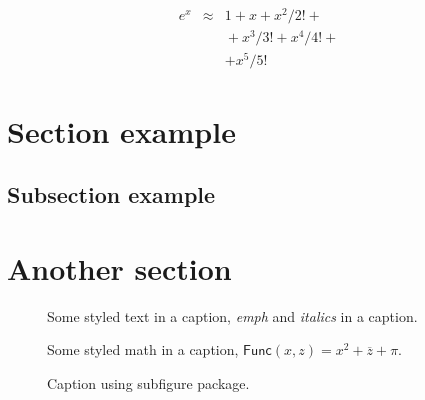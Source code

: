\lipsum*[65]
\begin{eqnarray}
 e^x &\approx& 1+x+x^2/2! + \\
   && {}+x^3/3! + x^4/4! + \\
   && + x^5/5!
\end{eqnarray}

\section{Section example}
\lipsum[47]

\subsection{Subsection example}
\lipsum[56]

\section{Another section}
\lipsum[55-56]

\begin{figure}
\framebox[\textwidth]{\parbox{\textwidth}{\lipsum[65]}}
\caption{Some styled text in a caption, \emph{emph} and \textit{italics} in a caption.}
\end{figure}

\begin{figure}
\framebox[\textwidth]{\parbox{\textwidth}{\lipsum[65]}}
\caption{Some styled math in a caption, $\mathsf{Func}(x, z) = x^2 + \overline{z} + \pi$.}
\end{figure}

\begin{figure}
\centering
{}
\hfill
{}
\caption{Caption using subfigure package.}
\end{figure}


